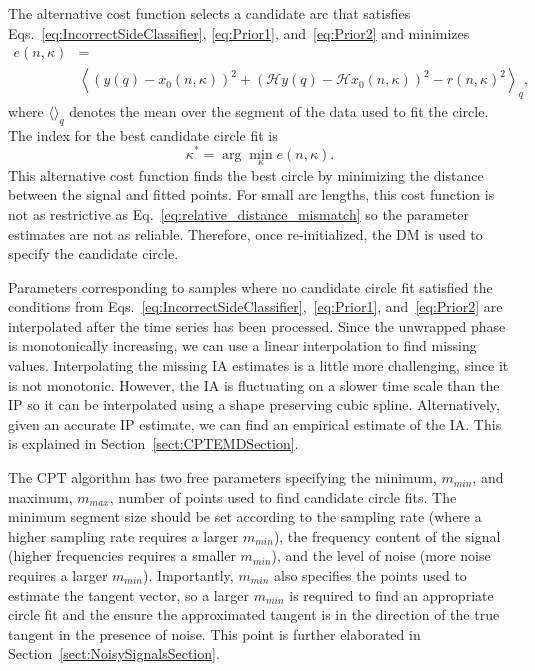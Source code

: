 \documentclass[journal,11pt,a4paper,onecolumn,draftcls]{IEEEtran}
\newcommand{\dean}[1]{\textsf{\emph{\textbf{\textcolor{green}{#1}}}}}
\begin{document}
The alternative cost function selects a candidate arc that satisfies Eqs.~\ref{eq:IncorrectSideClassifier}, \ref{eq:Prior1}, and~\ref{eq:Prior2} and minimizes
\begin{align}\label{BestCircFit2Reinitialize}
e\left( {n,\kappa} \right) &=  \\ \nonumber
 &\left\langle \left( y(q) - x_0\left( n,\kappa \right) \right)^2 + \left( \mathcal{H}y(q) - \mathcal{H}x_0\left( n,\kappa \right) \right)^2 - r\left( n,\kappa \right)^2 \right\rangle_q,
\end{align}
where $\langle\rangle_q$ denotes the mean over the segment of the data used to fit the circle. The index for the best candidate circle fit is
\begin{equation}\label{ReinitBestIndex}
\kappa^ * = \arg \mathop {\min }\limits_\kappa e\left( {n,\kappa} \right).
\end{equation}
This alternative cost function finds the best circle by minimizing the distance between the signal and fitted points. For small arc lengths, this cost function is not as restrictive as Eq.~\ref{eq:relative_distance_mismatch} so the parameter estimates are not as reliable. Therefore, once re-initialized, the DM is used to specify the candidate circle. %

Parameters corresponding to samples where no candidate circle fit satisfied the conditions from Eqs.~\ref{eq:IncorrectSideClassifier},~\ref{eq:Prior1}, and~\ref{eq:Prior2} are interpolated after the time series has been processed. Since the unwrapped phase is monotonically increasing, we can use a linear interpolation to find missing values. Interpolating the missing IA estimates is a little more challenging, since it is not monotonic. However, the IA is fluctuating on a slower time scale than the IP so it can be interpolated using a shape preserving cubic spline. Alternatively, given an accurate IP estimate, we can find an empirical estimate of the IA. This is explained in Section~\ref{sect:CPTEMDSection}. 

The CPT algorithm has two free parameters specifying the minimum, $m_{min}$, and maximum, $m_{max}$, number of points used to find candidate circle fits. The minimum segment size should be set according to the sampling rate (where a higher sampling rate requires a larger $m_{min}$), the frequency content of the signal (higher frequencies requires a smaller $m_{min}$), and the level of noise (more noise requires a larger $m_{min}$). Importantly, $m_{min}$ also specifies the points used to estimate the tangent vector, so a larger $m_{min}$ is required to find an appropriate circle fit and the ensure the approximated tangent is in the direction of the true tangent in the presence of noise. This point is further elaborated in Section~\ref{sect:NoisySignalsSection}. 
\end{document}
